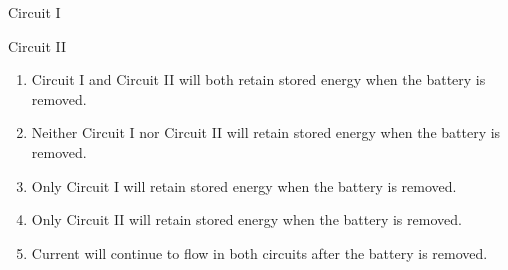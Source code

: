\documentclass{../../../oss-classkick}
\begin{document}
\begin{multicols*}{2}
\begin{enumerate}[leftmargin=18pt,resume]
    \vspace{-.2in}
    \begin{center}
      Circuit I\\
      
      Circuit II\\
    \end{center}
    \begin{enumerate}[nosep,leftmargin=18pt,label=(\Alph*)]
    \item Circuit I and Circuit II will both retain stored energy when the
      battery is removed.
    \item Neither Circuit I nor Circuit II will retain stored energy when the
      battery is removed.
    \item Only Circuit I will retain stored energy when the battery is
      removed.
    \item Only Circuit II will retain stored energy when the battery is
      removed.
    \item Current will continue to flow in both circuits after the battery is
      removed.
    \end{enumerate}
  \end{enumerate}
\end{multicols*}
\newpage


\genfreedirections
\end{document}
